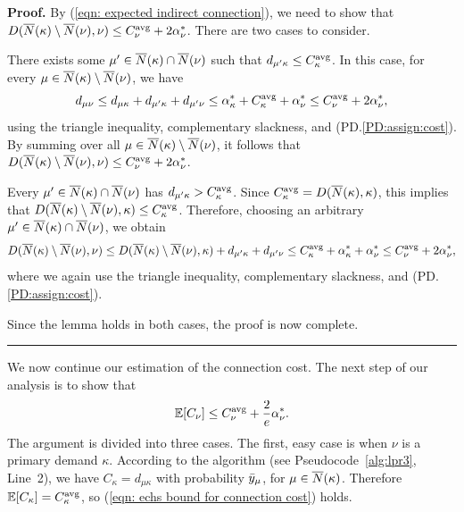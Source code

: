 \documentclass[oneside,final]{ucr}
\newenvironment{proof}[1][Proof]{\textbf{#1.} }{\ \rule{0.5em}{0.5em}}
\begin{document}
\begin{proof}
By (\ref{eqn: expected indirect connection}), we need to show that $D({\overline{N}}(\kappa)
  \setminus {\overline{N}}(\nu), \nu) \leq C^{{\mbox{\scriptsize\rm avg}}}_\nu +
  2\alpha_{\nu}^\ast$. There are two cases to consider.

\begin{description}
%	
\item{}
	 There exists some $\mu'\in {\overline{N}}(\kappa) \cap
  {\overline{N}}(\nu)$ such that $d_{\mu' \kappa} \leq C^{{\mbox{\scriptsize\rm avg}}}_\kappa$.
In this case, for every $\mu\in {\overline{N}}(\kappa)\setminus {\overline{N}}(\nu)$, we have
%
\begin{equation*}
d_{\mu \nu} \leq d_{\mu \kappa} + d_{\mu' \kappa} + d_{\mu' \nu}  
 	\le  \alpha^\ast_\kappa + C^{{\mbox{\scriptsize\rm avg}}}_\kappa + \alpha^\ast_{\nu}
  \leq C^{{\mbox{\scriptsize\rm avg}}}_\nu + 2\alpha_{\nu}^\ast,
\end{equation*}
%
using the triangle inequality, complementary slackness, and (PD.\ref{PD:assign:cost}).
By summing over all $\mu\in {\overline{N}}(\kappa) \setminus {\overline{N}}(\nu)$, it
follows that $D({\overline{N}}(\kappa) \setminus {\overline{N}}(\nu), \nu) \leq
C^{{\mbox{\scriptsize\rm avg}}}_\nu + 2\alpha_{\nu}^\ast$.

\item{}
 Every $\mu'\in {\overline{N}}(\kappa)\cap {\overline{N}}(\nu)$
has $d_{\mu'\kappa} > C^{{\mbox{\scriptsize\rm avg}}}_\kappa$. Since $C^{{\mbox{\scriptsize\rm avg}}}_{\kappa} = D({\overline{N}}(\kappa),\kappa)$,
this implies that
$D({\overline{N}}(\kappa) \setminus {\overline{N}}(\nu),\kappa)\leq C^{{\mbox{\scriptsize\rm avg}}}_{\kappa}$. Therefore,
choosing an arbitrary $\mu'\in {\overline{N}}(\kappa)\cap {\overline{N}}(\nu)$,
we obtain
%
\begin{equation*}
  D({\overline{N}}(\kappa) \setminus {\overline{N}}(\nu), \nu) 
	\leq  D({\overline{N}}(\kappa) \setminus {\overline{N}}(\nu), \kappa) 
			+ d_{\mu' \kappa} + d_{\mu' \nu} 
	\leq  C^{{\mbox{\scriptsize\rm avg}}}_{\kappa} +
  \alpha_{\kappa}^\ast + \alpha_{\nu}^\ast
	\leq C^{{\mbox{\scriptsize\rm avg}}}_\nu + 2\alpha_{\nu}^\ast,
\end{equation*}
%
where we again use the triangle inequality,
complementary slackness, and  (PD.\ref{PD:assign:cost}).
%
\end{description}
%
Since the lemma holds in both cases, the proof is now complete.
\end{proof}

We now continue our estimation of the connection cost.  The next step
of our analysis is to show that 
%
\begin{equation}
	\mathbb{E}[C_\nu]\le C^{{\mbox{\scriptsize\rm avg}}}_{\nu} + \frac{2}{e}\alpha^\ast_\nu.
	\label{eqn: echs bound for connection cost}
\end{equation}
%
The argument is divided into three cases. The first, easy case is when
$\nu$ is a primary demand $\kappa$. According to the algorithm
(see Pseudocode~\ref{alg:lpr3}, Line~2), we have $C_\kappa = d_{\mu\kappa}$ with probability ${\bar y}_{\mu}$, 
for $\mu\in {\overline{N}}(\kappa)$. Therefore $\mathbb{E}[C_\kappa] = C^{{\mbox{\scriptsize\rm avg}}}_{\kappa}$, so
(\ref{eqn: echs bound for connection cost}) holds.
\end{document}
